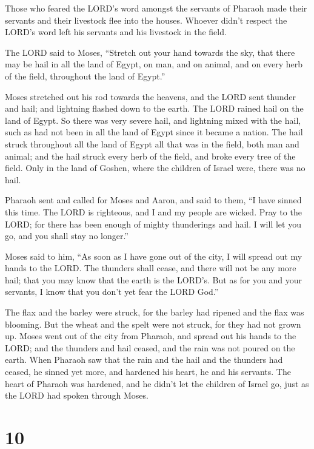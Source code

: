  Those who feared the LORD's word amongst the servants of
Pharaoh made their servants and their livestock flee into the houses.
 Whoever didn't respect the LORD's word left his servants
and his livestock in the field.

 The LORD said to Moses, ``Stretch out your hand towards
the sky, that there may be hail in all the land of Egypt, on man, and on
animal, and on every herb of the field, throughout the land of Egypt.''

 Moses stretched out his rod towards the heavens, and the
LORD sent thunder and hail; and lightning flashed down to the earth. The
LORD rained hail on the land of Egypt.  So there was very
severe hail, and lightning mixed with the hail, such as had not been in
all the land of Egypt since it became a nation.  The hail
struck throughout all the land of Egypt all that was in the field, both
man and animal; and the hail struck every herb of the field, and broke
every tree of the field.  Only in the land of Goshen, where
the children of Israel were, there was no hail.

 Pharaoh sent and called for Moses and Aaron, and said to
them, ``I have sinned this time. The LORD is righteous, and I and my
people are wicked.  Pray to the LORD; for there has been
enough of mighty thunderings and hail. I will let you go, and you shall
stay no longer.''

 Moses said to him, ``As soon as I have gone out of the
city, I will spread out my hands to the LORD. The thunders shall cease,
and there will not be any more hail; that you may know that the earth is
the LORD's.  But as for you and your servants, I know that
you don't yet fear the LORD God.''

 The flax and the barley were struck, for the barley had
ripened and the flax was blooming.  But the wheat and the
spelt were not struck, for they had not grown up.  Moses
went out of the city from Pharaoh, and spread out his hands to the LORD;
and the thunders and hail ceased, and the rain was not poured on the
earth.  When Pharaoh saw that the rain and the hail and the
thunders had ceased, he sinned yet more, and hardened his heart, he and
his servants.  The heart of Pharaoh was hardened, and he
didn't let the children of Israel go, just as the LORD had spoken
through Moses.

\hypertarget{section-9}{%
\section{10}\label{section-9}}

